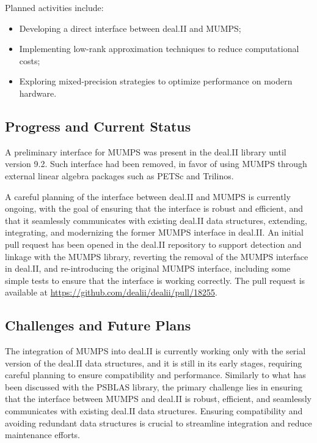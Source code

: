 \documentclass[a4paper,12pt]{article}
\begin{document}
    Planned activities include:
    \begin{itemize}
        \item Developing a direct interface between deal.II and MUMPS;
        \item Implementing low-rank approximation techniques to reduce computational costs;
        \item Exploring mixed-precision strategies to optimize performance on modern hardware.
    \end{itemize}

    \subsection{Progress and Current Status}
    A preliminary interface for MUMPS was present in the deal.II library until
    version 9.2. Such interface had been removed, in favor of using MUMPS
    through external linear algebra packages such as PETSc and Trilinos.
    
    A careful planning of the interface between deal.II and MUMPS is currently
    ongoing, with the goal of ensuring that the interface is robust and efficient,
    and that it seamlessly communicates with existing deal.II data structures, extending, integrating, and modernizing the former MUMPS interface in deal.II. An initial pull request
    has been opened in the deal.II repository to support detection and linkage
    with the MUMPS library, reverting the removal of the MUMPS interface in deal.II, and re-introducing the original MUMPS interface, including some simple tests to ensure that the interface is working correctly. The pull request is available at
    \url{https://github.com/dealii/dealii/pull/18255}.
    
    \subsection{Challenges and Future Plans}

    The integration of MUMPS into deal.II is currently working only with the
    serial version of the deal.II data structures, and it is still in its early
    stages, requiring careful planning to ensure compatibility and performance.
    Similarly to what has been discussed with the PSBLAS library, the primary
    challenge lies in ensuring that the interface between MUMPS and deal.II is
    robust, efficient, and seamlessly communicates with existing deal.II data
    structures. Ensuring compatibility and avoiding redundant data structures is
    crucial to streamline integration and reduce maintenance efforts.


%

    
\end{document}
